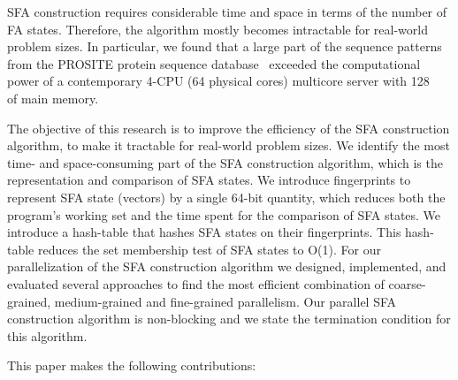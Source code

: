 \documentclass[10pt, conference, compsocconf]{IEEEtran}
\begin{document}
SFA construction requires considerable
time and space in terms of the number of FA states.
Therefore, the algorithm mostly becomes intractable for real-world
problem sizes. In particular, we found
that a large part of the sequence patterns from the
PROSITE protein sequence database~\cite{PROSITE,ScanProsite:2002}
exceeded the computational power of a contemporary 4-CPU (64 physical cores)
multicore server with \SI{128}{\giga\byte} of main memory.

The objective of this research is to improve the efficiency of the SFA
construction algorithm, to make it tractable for real-world problem sizes.
We identify the most time- and space-consuming
part of the SFA construction algorithm, which is the representation
and comparison of SFA states. We introduce fingerprints
to represent SFA state (vectors) by a single 64-bit quantity,
which reduces both the program's working set and
the time spent for the comparison of SFA states.
We introduce a hash-table that hashes SFA states on their
fingerprints. This hash-table reduces the set membership
test of SFA states to O(1).
For our parallelization of the SFA construction algorithm we designed,
implemented, and evaluated several approaches to find the most efficient
combination of coarse-grained, medium-grained and fine-grained parallelism. Our
parallel SFA construction algorithm is non-blocking and we state the termination
condition for this algorithm.


This paper makes the following contributions:
\end{document}
